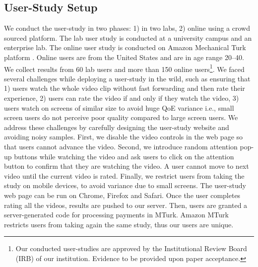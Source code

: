 \subsection{User-Study Setup}
We conduct the user-study in two phases: 1) in two labs, 2) online using a crowd sourced platform. The lab user study is conducted at a university campus and an enterprise lab. The online user study is conducted on Amazon Mechanical Turk platform \cite{turk-amazon}. Online users are from the United States and are in age range 20--40. We collect results from 60 lab users and more than 150 online users\footnote{Our conducted user-studies are approved by the Institutional Review Board (IRB) of our institution. Evidence to be provided upon paper acceptance.}. We faced several challenges  while deploying a user-study in the wild, such as ensuring that 1) users watch the whole video clip without fast forwarding and then rate their experience, 2) users can rate the video if and only if they watch the video, 3) users watch on screens of similar size  to avoid huge QoE variance i.e., small screen users do not perceive poor quality compared to large screen users. We address these challenges by carefully designing the user-study website and avoiding noisy samples. First, we disable the video controls in the web page so that users cannot advance the video. Second, we introduce random attention pop-up buttons while watching the video and ask users to click on the attention button to confirm that they are watching the video. A user cannot move to next video until the current video is rated. Finally, we restrict users from taking the study on mobile devices, to avoid variance due to small screens. The user-study web page can be run on Chrome, Firefox and Safari. Once the user completes rating all the videos, results are pushed to our server. Then, users are granted a server-generated code  for processing payments in MTurk. Amazon MTurk restricts users from taking again the same study, thus our users are unique.

